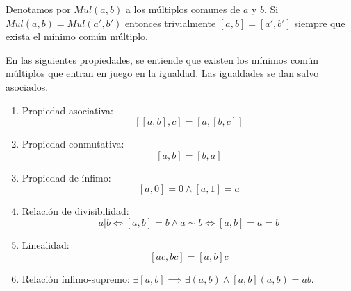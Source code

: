 Denotamos por $Mul(a,b)$ a los múltiplos comunes de $a$ y $b$. Si $Mul(a,b) = Mul(a',b')$ entonces trivialmente $[a,b] = [a',b']$ siempre que exista el mínimo común múltiplo.

\begin{proposition}
En las siguientes propiedades, se entiende que existen los mínimos común múltiplos que entran en
juego en la igualdad. Las igualdades se dan salvo asociados.

\begin{enumerate}
\item Propiedad asociativa: $$[[a,b],c] = [a,[b,c]]$$
\item Propiedad conmutativa: $$[a,b] = [b,a]$$
\item Propiedad de ínfimo: $$[a,0] = 0 \land [a,1] = a$$
\item Relación de divisibilidad: $$a|b \iff [a,b] = b \land a \sim b \iff [a,b] = a = b$$
\item Linealidad: $$[ac,bc] = [a,b]c$$
\item Relación ínfimo-supremo: $\exists [a,b] \implies \exists (a,b) \land [a,b](a,b) = ab$. 
\end{enumerate}
\end{proposition}

